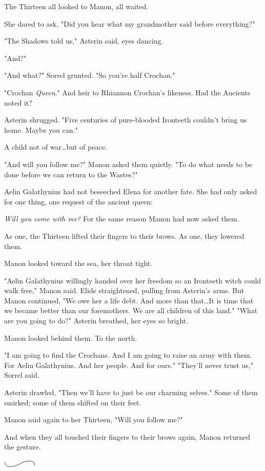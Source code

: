 The Thirteen all looked to Manon, all waited.

She dared to ask, "Did you hear what my grandmother said before  everything?"

"The Shadows told us," Asterin said, eyes dancing.

"And?"

"And what?"
Sorrel grunted.
"So you're half Crochan."

"Crochan \emph{Queen}."
And heir to Rhiannon Crochan's likeness.
Had the Ancients noted it?

Asterin shrugged.
"Five centuries of pure-blooded Ironteeth couldn't bring us home.
Maybe you can."

A child not of war\ldots but of peace.

"And will you follow me?"
Manon asked them quietly.
"To do what needs to be done before we can return to the Wastes?"

Aelin Galathynius had not beseeched Elena for another fate.
She had only asked for one thing, one request of the ancient queen:

\emph{Will you come with me?} For the same reason Manon had now asked them.

As one, the Thirteen lifted their fingers to their brows.
As one, they lowered them.

Manon looked toward the sea, her throat tight.

"Aelin Galathynius willingly handed over her freedom so an Ironteeth witch could walk free," Manon said.
Elide straightened, pulling from Asterin's arms.
But Manon continued, "We owe her a life debt.
And more than that\ldots It is time that we became better than our foremothers.
We are all children of this land."
"What are you going to do?"
Asterin breathed, her eyes so bright.

Manon looked behind them.
To the north.

"I am going to find the Crochans.
And I am going to raise an army with them.
For Aelin Galathynius.
And her people.
And for ours."
"They'll never trust us," Sorrel said.

Asterin drawled, "Then we'll have to just be our charming selves."
Some of them smirked; some of them shifted on their feet.

Manon said again to her Thirteen, "Will you follow me?"

And when they all touched their fingers to their brows again, Manon returned the gesture.

\begin{center}
	\includegraphics[width=0.65in,height=0.13in]{images/seperator}
\end{center}

